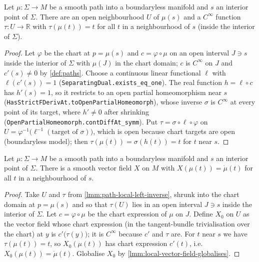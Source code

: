 \begin{lemma}
    \label{lmm:path-local-left-inverse}
    \leanok
    Let $\mu : \Sigma \to M$ be a smooth path into a boundaryless manifold and $s$ an interior point of $\Sigma$. There are an open neighbourhood $U$ of $\mu(s)$ and a $C^\infty$ function $\tau : U \to \mathbb{R}$ with $\tau(\mu(t)) = t$ for all $t$ in a neighbourhood of $s$ (inside the interior of $\Sigma$).
\end{lemma}
\begin{proof}
    \leanok
    Let $\varphi$ be the chart at $p = \mu(s)$ and $c = \varphi \circ \mu$ on an open interval $J \ni s$ inside the interior of $\Sigma$ with $\mu(J)$ in the chart domain; $c$ is $C^\infty$ on $J$ and $c'(s) \neq 0$ by \ref{def:paths}. Choose a continuous linear functional $\ell$ with $\ell(c'(s)) = 1$ (\texttt{SeparatingDual.exists\_eq\_one}). The real function $h = \ell \circ c$ has $h'(s) = 1$, so it restricts to an open partial homeomorphism near $s$ (\texttt{HasStrictFDerivAt.toOpenPartialHomeomorph}), whose inverse $\sigma$ is $C^\infty$ at every point of its target, where $h' \neq 0$ after shrinking (\texttt{OpenPartialHomeomorph.contDiffAt\_symm}). Put $\tau = \sigma \circ \ell \circ \varphi$ on $U = \varphi^{-1}\big(\ell^{-1}(\text{target of }\sigma)\big)$, which is open because chart targets are open (boundaryless model); then $\tau(\mu(t)) = \sigma(h(t)) = t$ for $t$ near $s$.
\end{proof}

\begin{lemma}
    \label{lmm:velocity-extends}
    \leanok
    Let $\mu : \Sigma \to M$ be a smooth path into a boundaryless manifold and $s$ an interior point of $\Sigma$. There is a smooth vector field $X$ on $M$ with $X(\mu(t)) = \dot\mu(t)$ for all $t$ in a neighbourhood of $s$.
\end{lemma}
\begin{proof}
    \leanok
    Take $U$ and $\tau$ from \ref{lmm:path-local-left-inverse}, shrunk into the chart domain at $p = \mu(s)$ and so that $\tau(U)$ lies in an open interval $J \ni s$ inside the interior of $\Sigma$. Let $c = \varphi \circ \mu$ be the chart expression of $\mu$ on $J$. Define $X_0$ on $U$ as the vector field whose chart expression (in the tangent-bundle trivialisation over the chart) at $y$ is $c'\big(\tau(y)\big)$; it is $C^\infty$ because $c'$ and $\tau$ are. For $t$ near $s$ we have $\tau(\mu(t)) = t$, so $X_0(\mu(t))$ has chart expression $c'(t)$, i.e.\ $X_0(\mu(t)) = \dot\mu(t)$. Globalise $X_0$ by \ref{lmm:local-vector-field-globalises}.
\end{proof}

